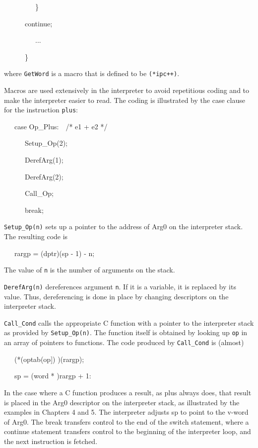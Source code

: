 {\ttfamily\mdseries
\ \ \ \ \ \ \ \ \ \}}

{\ttfamily\mdseries
\ \ \ \ \ \ continue;}

{\ttfamily\mdseries
\ \ \ \ \ \ \ \ \ ...}

{\ttfamily\mdseries
\ \ \ \ \ \ \}}

\noindent
where \texttt{GetWord} is a macro that is defined to be \texttt{(*ipc++)}.

Macros are used extensively in the interpreter to avoid repetitious
coding and to make the interpreter easier to read.  The coding is
illustrated by the case clause for the instruction \texttt{plus}:

{\ttfamily\mdseries
\ \ \ case Op\_Plus:\ \ /* e1 + e2 */}

{\ttfamily\mdseries
\ \ \ \ \ \ Setup\_Op(2);}

{\ttfamily\mdseries
\ \ \ \ \ \ DerefArg(1);}

{\ttfamily\mdseries
\ \ \ \ \ \ DerefArg(2);}

{\ttfamily\mdseries
\ \ \ \ \ \ Call\_Op;}

{\ttfamily\mdseries
\ \ \ \ \ \ break;}


\texttt{Setup\_Op(n)} sets up a pointer to the address of Arg0 on the
interpreter stack. The resulting code is

{\ttfamily\mdseries
\ \ \ rargp = (dptr)(sp - 1) - n;}

The value of \texttt{n} is the number of arguments on the stack.

\texttt{DerefArg(n)} dereferences argument \texttt{n}. If it is a
variable, it is replaced by its value. Thus, dereferencing is done in
place by changing descriptors on the interpreter stack.

\texttt{Call\_Cond} calls the appropriate C function with a pointer to
the interpreter stack as provided by \texttt{Setup\_Op(n)}. The
function itself is obtained by looking up \texttt{op} in an array of
pointers to functions.  The code produced by \texttt{Call\_Cond} is
(almost)

{\ttfamily\mdseries
\ \ \ (*(optab(op]) )(rargp);}

{\ttfamily\mdseries
\ \ \ sp = (word * )rargp + 1:}


\bigskip

In the case where a C function produces a result, as plus always does,
that result is placed in the Arg0 descriptor on the interpreter stack,
as illustrated by the examples in Chapters 4 and 5. The interpreter
adjusts sp to point to the v-word of Arg0. The break transfers control
to the end of the switch statement, where a continue statement
transfers control to the beginning of the interpreter loop, and the
next instruction is fetched.

